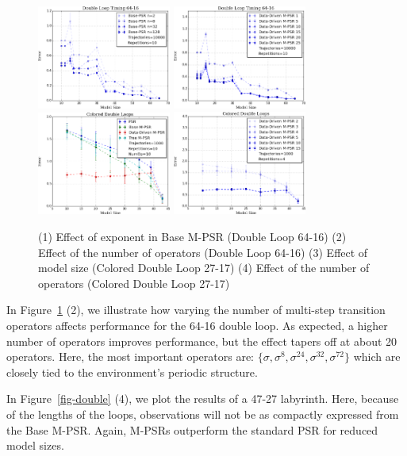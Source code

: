 \documentclass[letterpaper]{article}
\begin{document}
\begin{figure}[t!]
\centering
\includegraphics[width=44mm]{basePows.png}%
\includegraphics[width=44mm]{NumOpsTiming.png}%
\includegraphics[width=44mm]{MO_1k.png}%
\includegraphics[width=44mm]{numOpComparison.png}%
\caption{(1) Effect of exponent in Base M-PSR (Double Loop 64-16) (2) Effect of the number of operators (Double Loop 64-16) (3) Effect of model size (Colored Double Loop 27-17) (4) Effect of the number of operators (Colored Double Loop 27-17)\label{fig-colnumops}%
}
\end{figure}

In Figure~\ref{fig-colnumops} (2), we illustrate how varying the number of multi-step transition operators affects performance for the 64-16 double loop. As expected, a higher number of operators improves performance, but the effect tapers off at about 20 operators. Here, the most important operators are: $\{\sigma,\sigma^{8},\sigma^{24},\sigma^{32},\sigma^{72}\}$ which are closely tied to the environment's periodic structure.

In Figure~\ref{fig-double} (4), we plot the results of a 47-27 labyrinth.  Here, because of the lengths of the loops, observations will not be as compactly expressed from the Base M-PSR. Again, M-PSRs outperform the standard PSR for reduced model sizes.
\end{document}
